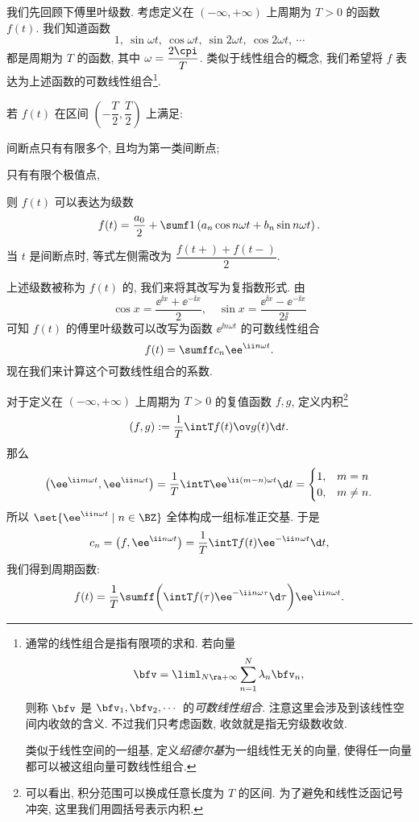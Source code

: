 我们先回顾下傅里叶级数.
考虑定义在 $(-\infty,+\infty)$ 上周期为 $T>0$ 的函数 $f(t)$.
我们知道函数
\[
  1,\ \sin{\omega t},\ \cos{\omega t},\ 
  \sin{2\omega t},\ \cos{2\omega t},\ \cdots
\]
都是周期为 $T$ 的函数, 其中 $\omega=\dfrac{2\cpi}T$.
类似于线性组合的概念, 我们希望将 $f$ 表达为上述函数的可数线性组合\footnote{
  通常的线性组合是指有限项的求和.
  若向量
  \[
    \bfv=\liml_{N\ra+\infty} \sum_{n=1}^N\lambda_n \bfv_n,
  \]
  则称 $\bfv$ 是 $\bfv_1,\bfv_2,\cdots$ 的\emph{可数线性组合}.
  注意这里会涉及到该线性空间内收敛的含义.
  不过我们只考虑函数, 收敛就是指无穷级数收敛.

  类似于线性空间的一组基, 定义\emph{绍德尔基}为一组线性无关的向量, 使得任一向量都可以被这组向量可数线性组合.
}.

\begin{theorem}
  若 $f(t)$ 在区间 $(-\dfrac T2,\dfrac T2)$ 上满足:
  \begin{enuma}
    \item 间断点只有有限多个, 且均为第一类间断点;
    \item 只有有限个极值点,
  \end{enuma}\par\noindent
  则 $f(t)$ 可以表达为级数
  \[
    f(t)=\frac{a_0}2+\sumf1 \left(a_n\cos n\omega t+b_n \sin n\omega t\right).
  \]
  当 $t$ 是间断点时, 等式左侧需改为 $\dfrac{f(t+)+f(t-)}2$.
\end{theorem}
上述级数被称为 $f(t)$ 的, 我们来将其改写为复指数形式.
由
\[
  \cos x=\frac{\ee^{\ii x}+\ee^{-\ii x}}2,\quad \sin x=\frac{\ee^{\ii x}-\ee^{-\ii x}}{2\ii }
\]
可知 $f(t)$ 的傅里叶级数可以改写为函数 $\ee^{\ii n\omega t}$ 的可数线性组合
\[
  f(t)=\sumff c_n\ee^{\ii n\omega t}.
\]
现在我们来计算这个可数线性组合的系数.

对于定义在 $(-\infty,+\infty)$ 上周期为 $T>0$ 的\alert{复值}函数 $f,g$, 定义内积\footnote{
  可以看出, 积分范围可以换成任意长度为 $T$ 的区间.
  为了避免和线性泛函记号冲突, 这里我们用圆括号表示内积.
}
\[
  (f,g):=\frac1T\intT f(t)\ov g(t)\d t.
\]
那么
\[
  \bigl(\ee^{\ii m\omega t},\ee^{\ii n\omega t}\bigr)
  =\frac1T\intT \ee^{\ii (m-n)\omega t}\d t
  =\begin{cases}
    1,&m=n\\
    0,&m\neq n.
  \end{cases}
\]
所以 $\set{\ee^{\ii n\omega t}\mid n\in\BZ}$ 全体构成一组标准正交基. 于是
\[
  c_n=\bigl(f,\ee^{\ii n\omega t}\bigr)
  =\frac 1T\intT f(t)\ee^{-\ii n\omega t} \d t,
\]
我们得到周期函数:
\[
  f(t)=\frac 1T\sumff \biggl(\intT f(\tau)\ee^{-\ii n\omega\tau} \d\tau\biggr) \ee^{\ii n\omega t}.
\]

